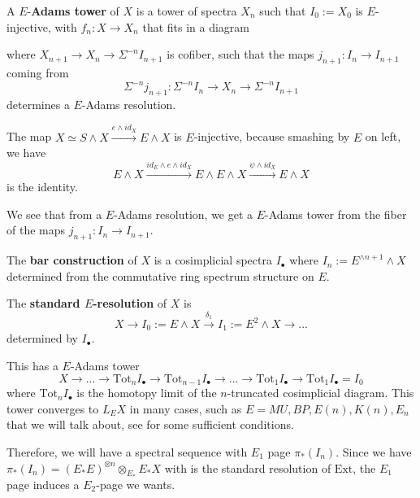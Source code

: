 \begin{definition}
 A $E$-\textbf{Adams tower} of $X$ is a tower of spectra $X_n$ such that $I_0:=X_0$ is $E$-injective, with $f_n:X\to X_n$ that fits in a diagram
 \begin{center}
\end{center}where $X_{n+1}\to X_n\to \Sigma^{-n}I_{n+1}$ is cofiber, such that the maps $j_{n+1}: I_n\to I_{n+1}$ coming from
\[
\Sigma^{-n}j_{n+1}: \Sigma^{-n}I_n\to X_n\to \Sigma^{-n}I_{n+1}
\]determines a $E$-Adams resolution.
\end{definition}

The map $X\simeq S\wedge X\xrightarrow{e\wedge id_X} E\wedge X$ is $E$-injective, because smashing by $E$ on left, we have 
\[
E\wedge X\xrightarrow{id_E\wedge e\wedge id_X}E\wedge E\wedge X\xrightarrow{\psi\wedge id_X}E\wedge X
\]is the identity.


We see that from a $E$-Adams resolution, we get a $E$-Adams tower from the fiber of the maps $j_{n+1}:I_n\to I_{n+1}$.

\begin{definition}
The \textbf{bar construction} of $X$ is a cosimplicial spectra $I_\bullet$ where $I_n:=E^{\wedge n+1}\wedge X$ determined from the commutative ring spectrum structure on $E$.

The \textbf{standard $E$-resolution} of $X$ is 
\[
    X\to I_0:=E\wedge X\xrightarrow{\delta_1} I_1:=E^{2}\wedge X\to...
\]determined by $I_\bullet$.

\end{definition}

This has a $E$-Adams tower
\[
X\to ... \to \mathrm{Tot}_n I_\bullet \to  \mathrm{Tot}_{n-1} I_\bullet \to ... \to  \mathrm{Tot}_1 I_\bullet \to  \mathrm{Tot}_1 I_\bullet=I_0 
\]
where $ \mathrm{Tot}_n I_\bullet $ is the homotopy limit of the $n$-truncated cosimplicial diagram. This tower converges to $L_E X$ in many cases, such as $E=MU, BP, E(n), K(n), E_n$ that we will talk about, see \cite{PreBousfieldLocalization} for some sufficient conditions.

Therefore, we will have a spectral sequence with $E_1$ page $\pi_*(I_n)$. Since we have $\pi_*(I_n)=(E_*E)^{\otimes n}\otimes_{E_*}E_*X$ with is the standard resolution of $\mathrm{Ext}$, the $E_1$ page induces a $E_2$-page we wants.